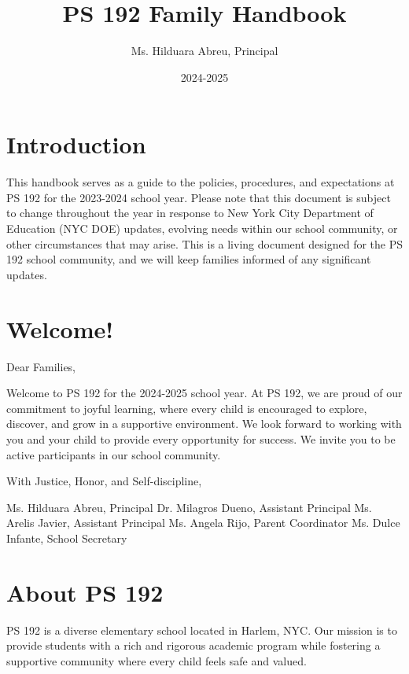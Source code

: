 \documentclass[11pt]{article}
\author{Ms. Hilduara Abreu, Principal}
\date{2024-2025}
\title{PS 192 Family Handbook}
\begin{document}


\pagenumbering{\fancyhf{}}
\pagestyle{headings}

\fancyhead[R]{\thepage}

\pagestyle{fancy}
\renewcommand{\footrulewidth}{1px}


\clearpage
\clearpage \tableofcontents \clearpage
\section{Introduction}
\label{sec:org17093d7}
This handbook serves as a guide to the policies, procedures, and expectations at PS 192 for the 2023-2024 school year. Please note that this document is subject to change throughout the year in response to New York City Department of Education (NYC DOE) updates, evolving needs within our school community, or other circumstances that may arise. This is a living document designed for the PS 192 school community, and we will keep families informed of any significant updates.

\section{Welcome!}
\label{sec:orgda6c0a4}
Dear Families,

Welcome to PS 192 for the 2024-2025 school year. At PS 192, we are proud of our commitment to joyful learning, where every child is encouraged to explore, discover, and grow in a supportive environment. We look forward to working with you and your child to provide every opportunity for success. We invite you to be active participants in our school community.

With Justice, Honor, and Self-discipline,

Ms. Hilduara Abreu, Principal
Dr. Milagros Dueno, Assistant Principal
Ms. Arelis Javier, Assistant Principal
Ms. Angela Rijo, Parent Coordinator
Ms. Dulce Infante, School Secretary

\section{About PS 192}
\label{sec:orgfa991b2}
PS 192 is a diverse elementary school located in Harlem, NYC. Our mission is to provide students with a rich and rigorous academic program while fostering a supportive community where every child feels safe and valued.
\end{document}
